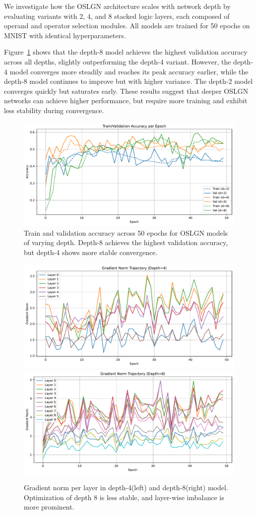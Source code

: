 We investigate how the OSLGN architecture scales with network depth by evaluating variants with 2, 4, and 8 stacked logic layers, each composed of operand and operator selection modules. 
All models are trained for 50 epochs on MNIST with identical hyperparameters.

Figure~\ref{fig:accuracy} shows that the depth-8 model achieves the highest validation accuracy across all depths, slightly outperforming the depth-4 variant. 
However, the depth-4 model converges more steadily and reaches its peak accuracy earlier, while the depth-8 model continues to improve but with higher variance. 
The depth-2 model converges quickly but saturates early. 
These results suggest that deeper OSLGN networks can achieve higher performance, but require more training and exhibit less stability during convergence.

\begin{figure}[H]
    \centering
    \includegraphics[width=0.85\linewidth]{figures/accuracy.pdf}
    \caption{Train and validation accuracy across 50 epochs for OSLGN models of varying depth. Depth-8 achieves the highest validation accuracy, but depth-4 shows more stable convergence.}
    \label{fig:accuracy}
\end{figure}

\begin{figure}[H]
    \centering
    \includegraphics[width=0.45\linewidth]{figures/gradnorm_lineplot_depth4.pdf}
    \includegraphics[width=0.45\linewidth]{figures/gradnorm_lineplot_depth8.pdf}
    \caption{Gradient norm per layer in depth-4(left) and depth-8(right) model. Optimization of depth 8 is less stable, and layer-wise imbalance is more prominent.}
    \label{fig:gradnorm_line_depth4}
\end{figure}

